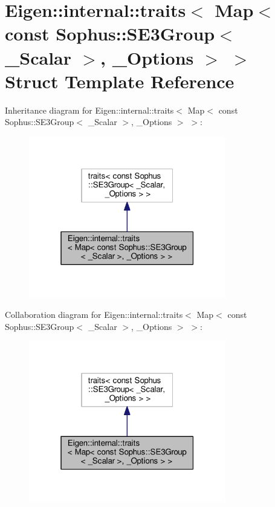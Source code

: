 \hypertarget{struct_eigen_1_1internal_1_1traits_3_01_map_3_01const_01_sophus_1_1_s_e3_group_3_01___scalar_01_4_00_01___options_01_4_01_4}{}\section{Eigen\+:\+:internal\+:\+:traits$<$ Map$<$ const Sophus\+:\+:S\+E3\+Group$<$ \+\_\+\+Scalar $>$, \+\_\+\+Options $>$ $>$ Struct Template Reference}
\label{struct_eigen_1_1internal_1_1traits_3_01_map_3_01const_01_sophus_1_1_s_e3_group_3_01___scalar_01_4_00_01___options_01_4_01_4}


Inheritance diagram for Eigen\+:\+:internal\+:\+:traits$<$ Map$<$ const Sophus\+:\+:S\+E3\+Group$<$ \+\_\+\+Scalar $>$, \+\_\+\+Options $>$ $>$\+:
\nopagebreak
\begin{figure}[H]
\begin{center}
\leavevmode
\includegraphics[width=244pt]{struct_eigen_1_1internal_1_1traits_3_01_map_3_01const_01_sophus_1_1_s_e3_group_3_01___scalar_01_52c0efe7410a24c8937f6ba1f1420d56}
\end{center}
\end{figure}


Collaboration diagram for Eigen\+:\+:internal\+:\+:traits$<$ Map$<$ const Sophus\+:\+:S\+E3\+Group$<$ \+\_\+\+Scalar $>$, \+\_\+\+Options $>$ $>$\+:
\nopagebreak
\begin{figure}[H]
\begin{center}
\leavevmode
\includegraphics[width=244pt]{struct_eigen_1_1internal_1_1traits_3_01_map_3_01const_01_sophus_1_1_s_e3_group_3_01___scalar_01_b6851729b2a680ef7dff19309b07fdc6}
\end{center}
\end{figure}
